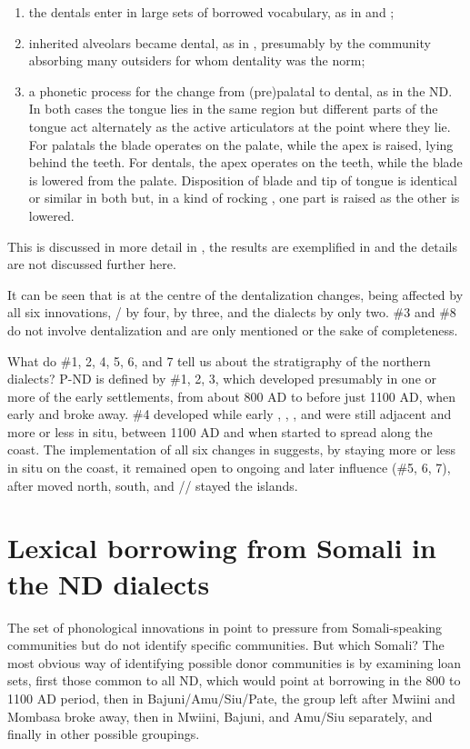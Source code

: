 \documentclass[output=paper,newtxmath,modfonts,nonflat,hidelinks]{langsci/langscibook}
\begin{document}
\begin{enumerate}
	
\item the dentals enter in large sets of borrowed vocabulary, as in  and ;
\item inherited alveolars became dental, as in , presumably by the community absorbing many outsiders for whom dentality was the norm; 
\item a phonetic process for the change from (pre)palatal to dental, as in the ND. In both cases the tongue lies in the same region but different parts of the tongue act alternately as the active articulators at the point where they lie. For palatals the blade operates on the palate, while the apex is raised, lying behind the teeth. For dentals, the apex operates on the teeth, while the blade is lowered from the palate. Disposition of blade and tip of tongue is identical or similar in both but, in a kind of rocking , one part is raised as the other is lowered.   

\end{enumerate}


This is discussed in more detail in \citealt{Nurse1985}, the results are exemplified in \citet[572-575]{Nurse1993} and the details are not discussed further here. 

 It can be seen that  is at the centre of the dentalization changes, being affected by all six innovations, / by four,  by three,  and the  dialects by only two. \#3 and \#8 do not involve dentalization and are only mentioned or the sake of completeness. 

  What do \#1, 2, 4, 5, 6, and 7 tell us about the stratigraphy of the northern dialects? P-ND is defined by \#1, 2, 3, which developed presumably in one or more of the early settlements, from about 800 AD to before just 1100 AD, when early  and  broke away. \#4 developed while early , , , and  were still adjacent and more or less in situ, between 1100 AD and when  started to spread along the coast. The implementation of all six changes in  suggests, by staying more or less in situ on the coast, it remained open to ongoing and later  influence (\#5, 6, 7), after  moved north,  south, and // stayed the islands. 

\section{Lexical borrowing from Somali in the ND dialects}\label{sec:nurse:5} The set of phonological innovations in  point to pressure from Somali-speaking communities but do not identify specific communities. But which Somali? The most obvious way of identifying possible donor communities is by examining loan sets, first those common to all ND, which would point at borrowing in the 800 to 1100 AD period, then in Bajuni/Amu/Siu/Pate, the group left after Mwiini and Mombasa broke away, then in Mwiini, Bajuni, and Amu/Siu separately, and finally in other possible groupings.
\end{document}
